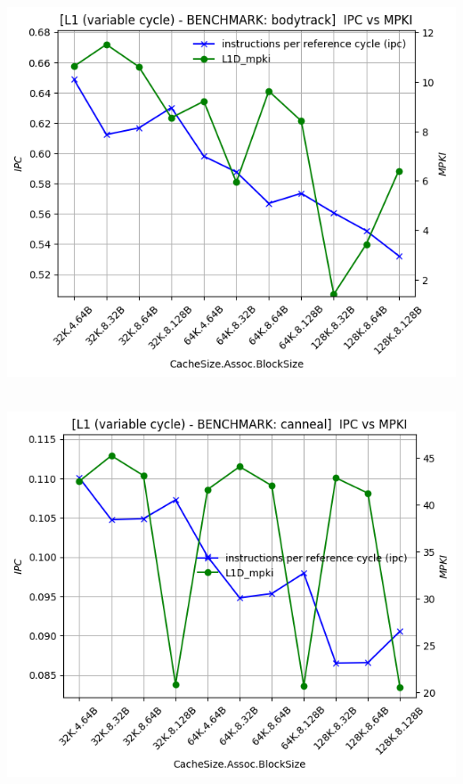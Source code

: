 \begin{minipage}{\textwidth}
    \begin{center}
        \\
        \vspace{3mm}
        \includegraphics[scale=0.65]{graphs/L1/var/bodytrack.png}
        \vspace{6mm}
    \end{center}
\end{minipage}

\begin{minipage}{\textwidth}
    \begin{center}
        \\
        \vspace{3mm}
        \includegraphics[scale=0.65]{graphs/L1/var/canneal.png}
        \vspace{6mm}
    \end{center}
\end{minipage}

